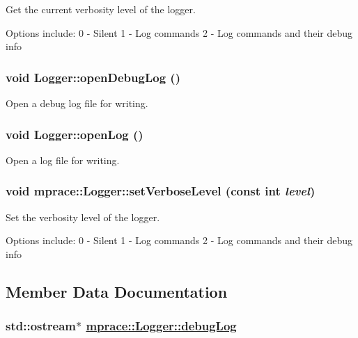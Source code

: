 Get the current verbosity level of the logger. 

Options include: 0 - Silent 1 - Log commands 2 - Log commands and their debug info\hypertarget{classmprace_1_1Logger_b1}{
\subsubsection[openDebugLog]{\setlength{\rightskip}{0pt plus 5cm}void Logger::open\-Debug\-Log ()}}
\label{classmprace_1_1Logger_b1}


Open a debug log file for writing. 

\hypertarget{classmprace_1_1Logger_b0}{
\subsubsection[openLog]{\setlength{\rightskip}{0pt plus 5cm}void Logger::open\-Log ()}}
\label{classmprace_1_1Logger_b0}


Open a log file for writing. 

\hypertarget{classmprace_1_1Logger_a3}{
\subsubsection[setVerboseLevel]{\setlength{\rightskip}{0pt plus 5cm}void mprace::Logger::set\-Verbose\-Level (const int {\em level})}}
\label{classmprace_1_1Logger_a3}


Set the verbosity level of the logger. 

Options include: 0 - Silent 1 - Log commands 2 - Log commands and their debug info

\subsection{Member Data Documentation}
\hypertarget{classmprace_1_1Logger_p1}{
\subsubsection[debugLog]{\setlength{\rightskip}{0pt plus 5cm}std::ostream$\ast$ \hyperlink{classmprace_1_1Logger_p1}{mprace::Logger::debug\-Log}}}
\label{classmprace_1_1Logger_p1}


